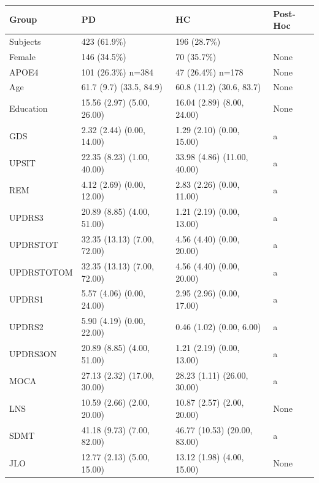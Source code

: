 \documentclass[1pt]{article}
\begin{document}
\begin{tabular}{llll}
	\toprule
	Group &                                 PD &                                 HC & Post-Hoc \\
	\midrule
	Subjects &                        423 (61.9\%) &                        196 (28.7\%) &          \\
	Female &                        146 (34.5\%) &                         70 (35.7\%) &     None \\
	APOE4 &                  101 (26.3\%) n=384 &                   47 (26.4\%) n=178 &     None \\
	Age &            61.7 (9.7) (33.5, 84.9) &           60.8 (11.2) (30.6, 83.7) &     None \\
	Education &         15.56 (2.97) (5.00, 26.00) &         16.04 (2.89) (8.00, 24.00) &     None \\
	GDS &          2.32 (2.44) (0.00, 14.00) &          1.29 (2.10) (0.00, 15.00) &        a \\
	UPSIT &         22.35 (8.23) (1.00, 40.00) &        33.98 (4.86) (11.00, 40.00) &        a \\
	REM &          4.12 (2.69) (0.00, 12.00) &          2.83 (2.26) (0.00, 11.00) &        a \\
	UPDRS3 &         20.89 (8.85) (4.00, 51.00) &          1.21 (2.19) (0.00, 13.00) &        a \\
	UPDRSTOT &        32.35 (13.13) (7.00, 72.00) &          4.56 (4.40) (0.00, 20.00) &        a \\
	UPDRSTOTOM &        32.35 (13.13) (7.00, 72.00) &          4.56 (4.40) (0.00, 20.00) &        a \\
	UPDRS1 &          5.57 (4.06) (0.00, 24.00) &          2.95 (2.96) (0.00, 17.00) &        a \\
	UPDRS2 &          5.90 (4.19) (0.00, 22.00) &           0.46 (1.02) (0.00, 6.00) &        a \\
	UPDRS3ON &         20.89 (8.85) (4.00, 51.00) &          1.21 (2.19) (0.00, 13.00) &        a \\
	MOCA &        27.13 (2.32) (17.00, 30.00) &        28.23 (1.11) (26.00, 30.00) &        a \\
	LNS &         10.59 (2.66) (2.00, 20.00) &         10.87 (2.57) (2.00, 20.00) &     None \\
	SDMT &         41.18 (9.73) (7.00, 82.00) &       46.77 (10.53) (20.00, 83.00) &        a \\
	JLO &         12.77 (2.13) (5.00, 15.00) &         13.12 (1.98) (4.00, 15.00) &     None \\

\end{tabular}
\end{document}
